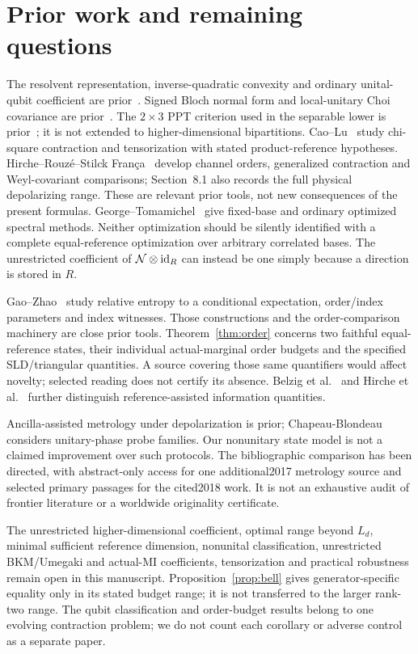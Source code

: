 \section{Prior work and remaining questions}\label{sec:prior}
The resolvent representation, inverse-quadratic convexity and ordinary unital-qubit coefficient are prior~\cite{HR}. Signed Bloch normal form and local-unitary Choi covariance are prior~\cite{RSW}. The \(2\times3\) PPT criterion used in the separable lower is prior~\cite{HHH}; it is not extended to higher-dimensional bipartitions.
Cao--Lu~\cite{CL} study chi-square contraction and tensorization with stated product-reference hypotheses. Hirche--Rouz\'e--Stilck Fran\c{c}a~\cite{HRF} develop channel orders, generalized contraction and Weyl-covariant comparisons; Section~8.1 also records the full physical depolarizing range. These are relevant prior tools, not new consequences of the present formulas. George--Tomamichel~\cite{GT} give fixed-base and ordinary optimized spectral methods. Neither optimization should be silently identified with a complete equal-reference optimization over arbitrary correlated bases. The unrestricted coefficient of \(\mathcal N\otimes\operatorname{id}_R\) can instead be one simply because a direction is stored in \(R\).

Gao--Zhao~\cite{GZ} study relative entropy to a conditional expectation, order/index parameters and index witnesses. Those constructions and the order-comparison machinery are close prior tools. Theorem~\ref{thm:order} concerns two faithful equal-reference states, their individual actual-marginal order budgets and the specified SLD/triangular quantities. A source covering those same quantifiers would affect novelty; selected reading does not certify its absence. Belzig et al.~\cite{Reverse} and Hirche et al.~\cite{Conditional} further distinguish reference-assisted information quantities.

Ancilla-assisted metrology under depolarization is prior; Chapeau-Blondeau~\cite{CB} considers unitary-phase probe families. Our nonunitary state model is not a claimed improvement over such protocols. The bibliographic comparison has been directed, with abstract-only access for one additional2017 metrology source and selected primary passages for the cited2018 work. It is not an exhaustive audit of frontier literature or a worldwide originality certificate.

The unrestricted higher-dimensional coefficient, optimal range beyond \(L_d\), minimal sufficient reference dimension, nonunital classification, unrestricted BKM/Umegaki and actual-MI coefficients, tensorization and practical robustness remain open in this manuscript. Proposition~\ref{prop:bell} gives generator-specific equality only in its stated budget range; it is not transferred to the larger rank-two range. The qubit classification and order-budget results belong to one evolving contraction problem; we do not count each corollary or adverse control as a separate paper.

